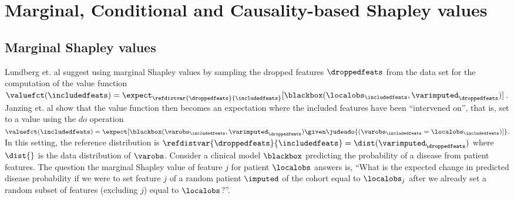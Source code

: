 \documentclass[nohyperref]{article}
\theoremstyle{plain}
\theoremstyle{definition}
\theoremstyle{remark}
\begin{document}



\section{Marginal, Conditional and Causality-based Shapley values}
\label{sec:ref_distrib}

\subsection{Marginal Shapley values}
Lundberg et. al  suggest using marginal Shapley values by sampling the dropped features $\droppedfeats$ from the data set for the computation of the value function $\valuefct({\includedfeats}) = \expect_{\refdistvar{\droppedfeats}{\includedfeats}}[\blackbox({\localobs_{\includedfeats}, \varimputed_{\droppedfeats}})]$. Janzing et. al  show that the value function then becomes an expectation where the included features have been ``intervened on'', that is,  set to a value using the $do$ operation $\valuefct({\includedfeats}) = \expect[\blackbox(\varobs_{\includedfeats}, \varimputed_{\droppedfeats})\given \judeado{\left(\varobs_{\includedfeats}=\localobs_{\includedfeats}\right)]}.$ In this setting, the reference distribution is $\refdistvar{\droppedfeats}{\includedfeats}=\dist({\varimputed_{\droppedfeats}})$ where $\dist{}$ is the data distribution of $\varobs$. Consider a clinical model $\blackbox$ predicting the probability of a disease from patient features. The question the marginal Shapley value of feature $j$ for patient $\localobs$ answers is, ``What is the expected change in predicted disease probability if we were to set feature $j$ of a random patient $\imputed$ of the cohort equal to $\localobs_j$ after we already set a random subset of features (excluding $j$) equal to $\localobs$?''. 
\end{document}
